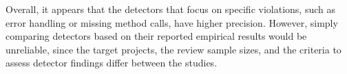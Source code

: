 Overall, it appears that the detectors that focus on specific violations, such as error handling or missing method calls, have higher precision.
However, simply comparing detectors based on their reported empirical results would be unreliable, since the target projects, the review sample sizes, and the criteria to assess detector findings differ between the studies.
